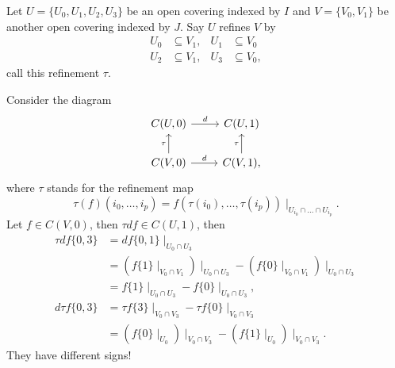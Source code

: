 \documentclass{article}
\begin{document}
Let $U=\{U_0, U_1, U_2, U_3\}$ be an open covering indexed by $I$ and $V=\{V_0, V_1\}$ be another open covering indexed by $J$. Say $U$ refines $V$ by
\begin{equation*}
\begin{aligned}
  U_0 &\subseteq V_1, & U_1&\subseteq V_0\\
  U_2 &\subseteq V_1, & U_3&\subseteq V_0,
\end{aligned}
\end{equation*}
call this refinement $\tau$.

Consider the diagram
\begin{equation*}
\begin{tikzcd}
  C(U, 0) \arrow[r, "d"]                   & C(U, 1) \\
  C(V, 0) \arrow[r, "d"] \arrow[u, "\tau"] & C(V, 1) \arrow[u, "\tau"],
\end{tikzcd}
\end{equation*}
where $\tau$ stands for the refinement map
$$
\tau(f)({i_0,\dots,i_p})=f(\tau(i_0),\dots,\tau(i_p))\mid_{U_{i_0}\cap\dots\cap U_{i_p}}.
$$
Let $f\in C(V, 0)$, then $\tau d f\in C(U, 1)$, then
\begin{equation*}
\begin{aligned}
  \tau d f\{0,3\} &= d f\{0,1\}\mid_{U_0\cap U_3}\\
                  &= \left(f\{1\}\mid_{V_0\cap V_1}\right)\mid_{U_0\cap U_3} - 
                     \left(f\{0\}\mid_{V_0\cap V_1}\right)\mid_{U_0\cap U_3} \\
                  &= f\{1\}\mid_{U_0\cap U_3} - f\{0\}\mid_{U_0\cap U_3}, \\
  d\tau f\{0,3\}  &= \tau f\{3\}\mid_{V_0\cap V_3} -\tau f\{0\}\mid_{V_0\cap V_3}\\
                  &= \left(f\{0\}\mid_{U_0}\right)\mid_{V_0\cap V_3} -
                     \left(f\{1\}\mid_{U_0}\right)\mid_{V_0\cap V_3}.
\end{aligned}
\end{equation*}
They have different signs!
\end{document}
